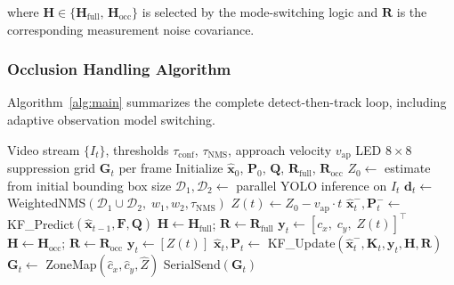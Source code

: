 \documentclass{jstarticle}
\theoremstyle{remark}
\begin{document}
\noindent where $\mathbf{H} \in
\{\mathbf{H}_{\mathrm{full}},\,\mathbf{H}_{\mathrm{occ}}\}$ is
selected by the mode-switching logic and $\mathbf{R}$ is the
corresponding measurement noise covariance.

\subsubsection{Occlusion Handling Algorithm}

Algorithm~\ref{alg:main} summarizes the complete
detect-then-track loop, including adaptive observation model switching.

\begin{algorithm}[H]
\caption{AuraBeam Detect-Track Loop with Adaptive Sensor Fusion}
\label{alg:main}
\begin{algorithmic}[1]
\Require Video stream $\{I_t\}$, thresholds
         $\tau_{\mathrm{conf}}$, $\tau_{\mathrm{NMS}}$,
         approach velocity $v_{\mathrm{ap}}$
\Ensure  LED $8\times8$ suppression grid $\mathbf{G}_t$ per frame
\State Initialize $\hat{\mathbf{x}}_0$, $\mathbf{P}_0$,
       $\mathbf{Q}$, $\mathbf{R}_{\mathrm{full}}$,
       $\mathbf{R}_{\mathrm{occ}}$
\State $Z_0 \gets$ estimate from initial bounding box size
    \State $\mathcal{D}_1, \mathcal{D}_2 \gets$ parallel YOLO
           inference on $I_t$
    \State $\mathbf{d}_t \gets$
           WeightedNMS$(\mathcal{D}_1 \cup \mathcal{D}_2,\;
           w_1, w_2, \tau_{\mathrm{NMS}})$
           \hfill{}
    \State $Z(t) \gets Z_0 - v_{\mathrm{ap}} \cdot t$
           \hfill{}
    \State $\hat{\mathbf{x}}^-_t, \mathbf{P}^-_t \gets$
           KF\_Predict$(\hat{\mathbf{x}}_{t-1}, \mathbf{F},
           \mathbf{Q})$
           \hfill{}
        \State $\mathbf{H} \gets \mathbf{H}_{\mathrm{full}}$;\quad
               $\mathbf{R} \gets \mathbf{R}_{\mathrm{full}}$
        \State $\mathbf{y}_t \gets [c_x,\; c_y,\; Z(t)]^{\top}$
    \Else
        \State $\mathbf{H} \gets \mathbf{H}_{\mathrm{occ}}$;\quad
               $\mathbf{R} \gets \mathbf{R}_{\mathrm{occ}}$
        \State $\mathbf{y}_t \gets [Z(t)]$
               \hfill{}
    \EndIf
    \State $\hat{\mathbf{x}}_t, \mathbf{P}_t \gets$
           KF\_Update$(\hat{\mathbf{x}}^-_t, \mathbf{K}_t,
           \mathbf{y}_t, \mathbf{H}, \mathbf{R})$
           \hfill{}
    \State $\mathbf{G}_t \gets$
           ZoneMap$(\hat{c}_x, \hat{c}_y, \hat{Z})$
           \hfill{}
    \State SerialSend$(\mathbf{G}_t)$
           \hfill{}
\EndFor
\end{algorithmic}
\end{algorithm}
\end{document}
